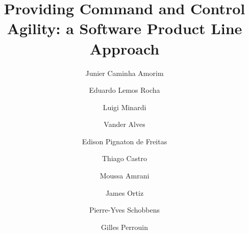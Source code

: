 \documentclass[preprint,12pt,table]{elsarticle}
\begin{document}
\begin{frontmatter}


\title{Providing Command and Control Agility: a Software Product Line Approach}




\author[unbaddress]{Junier Caminha Amorim}

\author[unbaddress]{Eduardo Lemos Rocha}

\author[unbaddress]{Luigi Minardi}

\author[unbaddress]{Vander Alves}

\author[ufrgsaddress]{Edison Pignaton de Freitas}

\author[ebaddress]{Thiago Castro}

\author[unamur]{Moussa Amrani}

\author[unamur]{James Ortiz}

\author[unamur]{Pierre-Yves Schobbens}

\author[unamur]{Gilles Perrouin}

%
%
\address[unbaddress]{Department of Computer Science, University of Brasilia, Brazil}
\address[ufrgsaddress]{Institute of Informatics, Federal University of Rio Grande do Sul, Brazil}
\address[ebaddress]{Systems Development Center, Brazilian Army, Brazil}
\address[unamur]{Precise Research Center, NaDI, University of Namur, Belgium}



\end{frontmatter}
\end{document}
